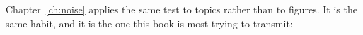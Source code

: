 Chapter~\ref{ch:noise} applies the same test to topics rather than to figures.
It is the same habit, and it is the one this book is most trying to transmit:
